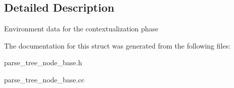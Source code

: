 \subsection{Detailed Description}
Environment data for the contextualization phase 

The documentation for this struct was generated from the following files\+:\begin{DoxyCompactItemize}
\item 
parse\+\_\+tree\+\_\+node\+\_\+base.\+h\item 
parse\+\_\+tree\+\_\+node\+\_\+base.\+cc\end{DoxyCompactItemize}
